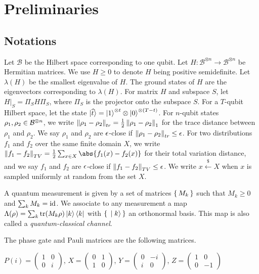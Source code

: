 \section{Preliminaries}


\subsection{Notations}

Let $\mathcal{B}$ be the Hilbert space corresponding to one qubit. Let $H:\mathcal{B}^{\otimes n}\rightarrow\mathcal{B}^{\otimes n}$ be Hermitian matrices. We use $H\geq0$ to denote $H$ being positive semidefinite. Let $\lambda(H)$ be the smallest eigenvalue of $H$. The ground states of $H$ are the eigenvectors corresponding to $\lambda(H)$. For matrix $H$ and subspace $S$, let $H\big|_S=\Pi_S H \Pi_S$, where $\Pi_S$ is the projector onto the subspace $S$. For a $T$-qubit Hilbert space, let the state $\ket{\widehat{t}}=\ket{1}^{\otimes t}\otimes \ket{0}^{{\otimes (T-t)}}$.
For $n$-qubit states $\rho_1, \rho_2\in\mathcal{B}^{\otimes n}$,
we write $\left\lVert\rho_1-\rho_2\right\rVert_{tr}=\frac{1}{2}\left\lVert\rho_1-\rho_2\right\rVert_1$ for the trace distance between $\rho_1$ and $\rho_2$. We say $\rho_1$ and $\rho_2$ are $\epsilon$-close if $\left\lVert\rho_1- \rho_2\right\rVert_{tr}\leq\epsilon$.
For two distributions $f_1$ and $f_2$ over the same finite domain $X$, we write $\norm{f_1-f_2}_{TV}=\frac{1}{2}\sum_{x\in X}\abs{f_1(x)-f_2(x)}$ for their total variation distance,
and we say $f_1$ and $f_2$ are $\epsilon$-close if $\left\lVert f_1-f_2\right\rVert_{TV}\leq\epsilon$.
We write $x\xleftarrow{\$}X$ when $x$ is sampled uniformly at random from the set $X$.

\begin{definition} 
	\label{def:QCChannel}
	A quantum measurement is given by a set of matrices $\set{M_k}$ such that $M_k\geq0$ and $\sum_k M_k=\operatorname{id}$.
	We associate to any measurement a map $\Lambda(\rho)=\sum_k \operatorname{tr}(M_k\rho)\ket{k}\bra{k}$
	with $\set{\ket{k}}$ an orthonormal basis.
	This map is also called a \emph{quantum-classical channel}.
\end{definition}

The phase gate and Pauli matrices are the following matrices.

\begin{definition}
	$P(i)=\begin{pmatrix}1&0\\0&i\end{pmatrix}$,
	$X=\begin{pmatrix}0&1\\1&0\end{pmatrix}$,
	$Y=\begin{pmatrix}0&-i\\i&0\end{pmatrix}$,
	$Z=\begin{pmatrix}1&0\\0&-1\end{pmatrix}$
\end{definition}


